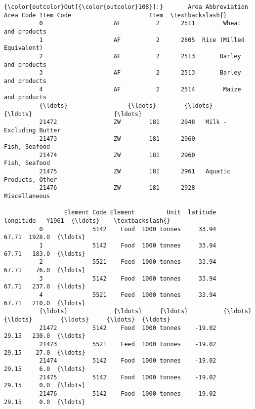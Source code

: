 \documentclass[11pt]{article}
\begin{document}
\begin{Verbatim}[commandchars=\\\{\}]
{\color{outcolor}Out[{\color{outcolor}108}]:}       Area Abbreviation  Area Code Item Code                      Item  \textbackslash{}
          0                    AF          2      2511        Wheat and products   
          1                    AF          2      2805  Rice (Milled Equivalent)   
          2                    AF          2      2513       Barley and products   
          3                    AF          2      2513       Barley and products   
          4                    AF          2      2514        Maize and products   
          {\ldots}                 {\ldots}        {\ldots}       {\ldots}                       {\ldots}   
          21472                ZW        181      2948   Milk - Excluding Butter   
          21473                ZW        181      2960             Fish, Seafood   
          21474                ZW        181      2960             Fish, Seafood   
          21475                ZW        181      2961   Aquatic Products, Other   
          21476                ZW        181      2928             Miscellaneous   
          
                 Element Code Element         Unit  latitude  longitude   Y1961  {\ldots}    \textbackslash{}
          0              5142    Food  1000 tonnes     33.94      67.71  1928.0  {\ldots}     
          1              5142    Food  1000 tonnes     33.94      67.71   183.0  {\ldots}     
          2              5521    Feed  1000 tonnes     33.94      67.71    76.0  {\ldots}     
          3              5142    Food  1000 tonnes     33.94      67.71   237.0  {\ldots}     
          4              5521    Feed  1000 tonnes     33.94      67.71   210.0  {\ldots}     
          {\ldots}             {\ldots}     {\ldots}          {\ldots}       {\ldots}        {\ldots}     {\ldots}  {\ldots}     
          21472          5142    Food  1000 tonnes    -19.02      29.15   230.0  {\ldots}     
          21473          5521    Feed  1000 tonnes    -19.02      29.15    27.0  {\ldots}     
          21474          5142    Food  1000 tonnes    -19.02      29.15     6.0  {\ldots}     
          21475          5142    Food  1000 tonnes    -19.02      29.15     0.0  {\ldots}     
          21476          5142    Food  1000 tonnes    -19.02      29.15     0.0  {\ldots}     
          

\end{Verbatim}
\end{document}
